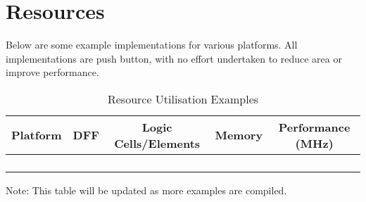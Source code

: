 \chapter{Resources}

Below are some example implementations for various platforms. All implementations are push button, with no effort undertaken to reduce area or improve performance. 
\setlength\LTleft{0pt}
\setlength\LTright{0pt}

\begin{longtable}[]{@{\extracolsep{\fill}}lcccc@{}}
	\toprule
		\textbf{Platform} & \textbf{DFF} & \textbf{Logic Cells/Elements} &
		\textbf{Memory} & \textbf{Performance (MHz)}\tabularnewline
	\midrule
	\endhead
		& & & &\tabularnewline
		& & & &\tabularnewline
		& & & &\tabularnewline
	\bottomrule
	\caption{Resource Utilisation Examples}
	\label{tab:RESOURCES}
\end{longtable}

Note: This table will be updated as more examples are compiled.

